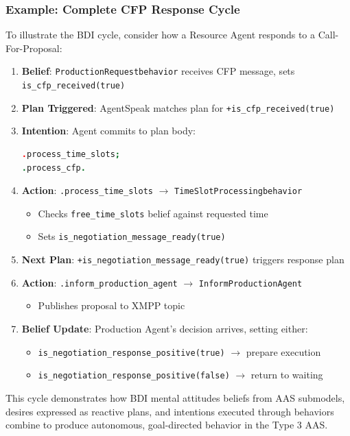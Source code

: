 \subsubsection{Example: Complete CFP Response Cycle}
To illustrate the \ac{BDI} cycle, consider how a Resource Agent responds to a Call-For-Proposal:
\begin{enumerate}
    \item \textbf{Belief}: \texttt{ProductionRequestbehavior} receives CFP message, sets \texttt{is\_cfp\_received(true)}
    
    \item \textbf{Plan Triggered}: AgentSpeak matches plan for \texttt{+is\_cfp\_received(true)}
    
    \item \textbf{Intention}: Agent commits to plan body:
    \begin{lstlisting}[language=Prolog, numbers=none]
.process_time_slots;
.process_cfp.
    \end{lstlisting}
    
    \item \textbf{Action}: \texttt{.process\_time\_slots} $\rightarrow$ \texttt{TimeSlotProcessingbehavior}
    \begin{itemize}
        \item Checks \texttt{free\_time\_slots} belief against requested time
        \item Sets \texttt{is\_negotiation\_message\_ready(true)}
    \end{itemize}
    
    \item \textbf{Next Plan}: \texttt{+is\_negotiation\_message\_ready(true)} triggers response plan
    
    \item \textbf{Action}: \texttt{.inform\_production\_agent} $\rightarrow$ \texttt{InformProductionAgent}
    \begin{itemize}
        \item Publishes proposal to XMPP topic
    \end{itemize}
    
    \item \textbf{Belief Update}: Production Agent's decision arrives, setting either:
    \begin{itemize}
        \item \texttt{is\_negotiation\_response\_positive(true)} $\rightarrow$ prepare execution
        \item \texttt{is\_negotiation\_response\_positive(false)} $\rightarrow$ return to waiting
    \end{itemize}
\end{enumerate}
This cycle demonstrates how \ac{BDI} mental attitudes beliefs from \ac{AAS} submodels, desires expressed as reactive plans, and intentions executed through behaviors combine to produce autonomous, goal-directed behavior in the Type 3 \ac{AAS}.


